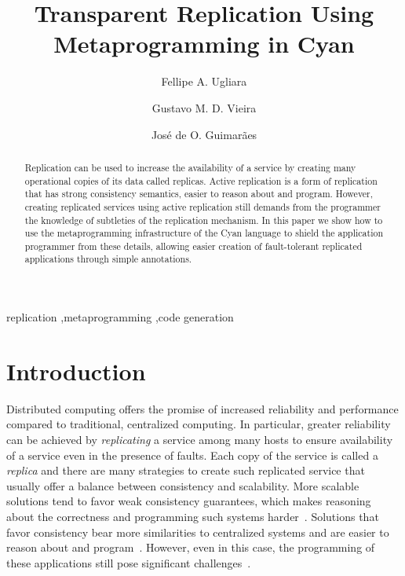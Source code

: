 \documentclass[preprint,review]{elsarticle}
\newcommand{\titulo}{Transparent Replication Using Metaprogramming in Cyan}
\begin{document}
\begin{frontmatter}

\title{\titulo}

\author[dcomp]{Fellipe A. Ugliara}
\author[dcomp]{Gustavo M. D. Vieira}
\author[dcomp]{José de O. Guimarães}

\address[dcomp]{DComp -- CCGT -- UFSCar, Sorocaba, Brazil}

\begin{abstract}
  Replication can be used to increase the availability of a service by
  creating  many  operational  copies  of its  data  called  replicas.
  Active  replication  is  a  form  of  replication  that  has  strong
  consistency semantics, easier to reason about and program.  However,
  creating replicated services using  active replication still demands
  from the programmer  the knowledge of subtleties  of the replication
  mechanism.  In  this paper  we show how  to use  the metaprogramming
  infrastructure  of  the  Cyan  language to  shield  the  application
  programmer  from   these  details,   allowing  easier   creation  of
  fault-tolerant replicated applications through simple annotations.
\end{abstract}

\begin{keyword}
  replication \sep metaprogramming \sep code generation
\end{keyword}

\end{frontmatter}


\section{Introduction}

Distributed computing offers the  promise of increased reliability and
performance  compared  to   traditional,  centralized  computing.   In
particular, greater reliability can  be achieved by \emph{replicating}
a service among many hosts to  ensure availability of a service even in
the  presence  of faults.   Each  copy  of  the  service is  called  a
\emph{replica} and there are many strategies to create such replicated
service  that   usually  offer  a  balance   between  consistency  and
scalability.  More scalable solutions  tend to favor weak consistency
guarantees,   which  makes   reasoning  about   the  correctness   and
programming  such systems  harder~\cite{vogels2009}.  Solutions  that
favor consistency  bear more  similarities to centralized  systems and
are         easier         to         reason         about         and
program~\cite{schneider1990implementing}.  However, even in this case,
the  programming   of  these   applications  still   pose  significant
challenges~\cite{burrows2006chubby}.
\end{document}
